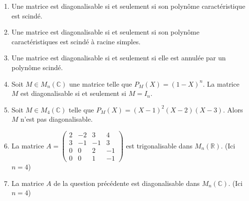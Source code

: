 \begin{enumerate}
    \item Une matrice est diagonalisable si et seulement si son polynôme caractéristique est scindé.
    \item Une matrice est diagonalisable si et seulement si son polynôme caractéristiques est scindé à racine simples.
    \item Une matrice est diagonalisable si et seulement si elle est annulée par un polynôme scindé.
    \item Soit $M \in M_n(\mathbb{C})$ une matrice telle que $P_M(X) = (1 - X)^n$. La matrice $M$ est diagonalisable si et seulement si $M = I_n$.
    \item Soit $M \in M_4(\mathbb{C})$ telle que $P_M(X) = (X - 1)^2(X - 2)(X - 3)$. Alors $M$ n’est pas diagonalisable.
    \item La matrice $A = \begin{pmatrix} 2 & -2 & 3 & 4 \\ 3 & -1 & -1 & 3 \\ 0 & 0 & 2 & -1 \\ 0 & 0 & 1 & -1 \end{pmatrix}$ est trigonalisable dans $M_n(\mathbb{R})$. (Ici $n=4$)
    \item La matrice $A$ de la question précédente est diagonalisable dans $M_n(\mathbb{C})$. (Ici $n=4$)
\end{enumerate}

